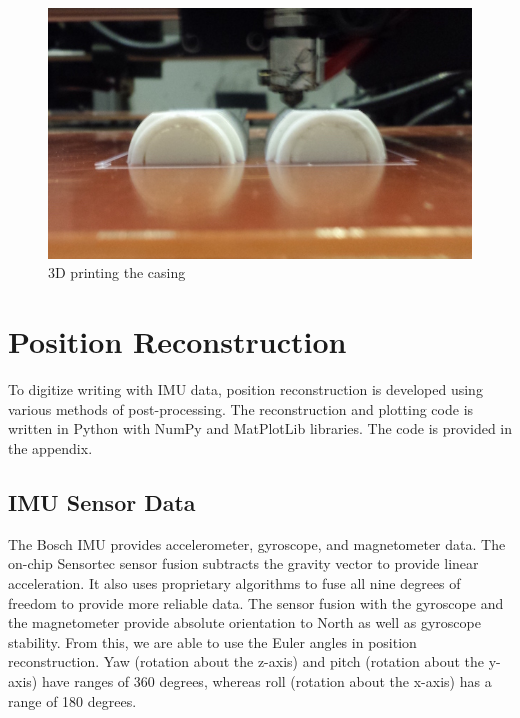 \documentclass[12pt,journal]{IEEEtran}
\begin{document}
\begin{figure}[h]
  \centering
    \includegraphics[width=0.6\linewidth]{figures/3d-print}
  \caption{3D printing the casing}
  \label{fig:3d-print}
\end{figure}

\section{Position Reconstruction}
To digitize writing with IMU data, position reconstruction is developed using various methods of post-processing. The reconstruction and plotting code is written in Python with NumPy and MatPlotLib libraries. The code is provided in the appendix.

\subsection{IMU Sensor Data}
	The Bosch IMU provides accelerometer, gyroscope, and magnetometer data. The on-chip Sensortec sensor fusion subtracts the gravity vector to provide linear acceleration. It also uses proprietary algorithms to fuse all nine degrees of freedom to provide more reliable data. The sensor fusion with the gyroscope and the magnetometer provide absolute orientation to North as well as gyroscope stability. From this, we are able to use the Euler angles in position reconstruction. Yaw (rotation about the z-axis) and pitch (rotation about the y-axis) have ranges of 360 degrees, whereas roll (rotation about the x-axis) has a range of 180 degrees.
\end{document}
